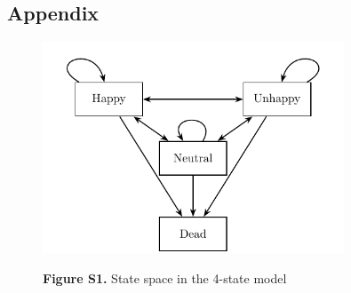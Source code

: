 \documentclass[12pt, a4paper]{article}
\begin{document}
\newpage
\printbibliography

\renewcommand\theequation{\Alph{section}\arabic{equation}} %
\renewcommand\thefigure{\Alph{section}\arabic{figure}} %

\newpage
\begin{appendices}

  \section*{Appendix}

  \begin{figure}[htbp]
    \centering
    \caption*{\textbf{Figure S1.} State space in the 4-state model}
    \includegraphics[width=0.8\textwidth]{fig_tabs_b300/latex_output/State_space_4s.pdf}
    \label{fig:State_space_4s}
  \end{figure}



\end{appendices}
\end{document}
